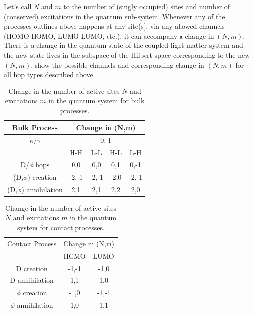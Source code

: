 \documentclass[a4paper,twocolumn]{revtex4-1} %
\begin{document}
Let's call $N$ and $m$ to the number of (singly occupied) sites
and number of (conserved) excitations in the quantum sub-system.
Whenever any of the processes outlines above happens at any site(s), via any allowed channels (HOMO-HOMO, LUMO-LUMO, etc.),
it can accompany a 
change in %
$(N,m)$.
There is a change in the quantum state of the coupled light-matter system and the new state lives in the subspace of the Hilbert space corresponding to the new $(N,m)$.
 show the possible channels and corresponding change in $(N,m)$ for all hop types described above.

\begin{table}[h]
\begin{center}
\begin{tabular}{ |c|c|c|c|c| } 
 \hline
 Bulk Process & \multicolumn{4}{|c|}{Change in (N,m)} \\
 \hline
$\kappa/\gamma$ %
& \multicolumn{4}{|c|}{0,-1}\\
\hline
 &H-H & L-L & H-L & L-H\\ 
D/$\phi$ hops & 0,0 &0,0 & 0,1 & 0,-1\\ 
(D,$\phi$) creation & -2,-1 &-2,-1 & -2,0 & -2,-1\\ 
(D,$\phi$) annihilation & 2,1 &2,1 & 2,2 & 2,0\\ 
 \hline
\end{tabular}
\end{center}
\caption{Change in the number of active sites $N$ and excitations $m$ in the quantum system for bulk processes.\label{tab:bulk}}
\end{table}

\begin{table}[h]
\begin{center}
\begin{tabular}{ |c|c|c| } 
 \hline
Contact Process & \multicolumn{2}{|c|}{Change in (N,m)} \\
 &HOMO & LUMO\\ 
\hline
D creation & -1,-1 & -1,0\\ 
D annihilation & 1,1 & 1,0\\ 
$\phi$ creation & -1,0 & -1,-1\\ 
$\phi$ annihilation & 1,0 & 1,1\\ 
 \hline
\end{tabular}
\end{center}
\caption{Change in the number of active sites $N$ and excitations $m$ in the quantum system for contact processes.\label{tab:cont}}
\end{table}
\end{document}
